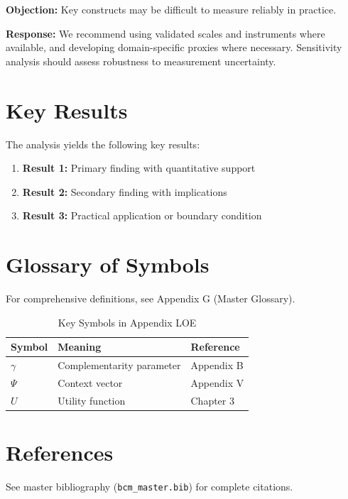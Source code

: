 \textbf{Objection:} Key constructs may be difficult to measure reliably in
practice.

\textbf{Response:} We recommend using validated scales and instruments where
available, and developing domain-specific proxies where necessary. Sensitivity
analysis should assess robustness to measurement uncertainty.





\section{Key Results}
\label{sec:loe-results}

The analysis yields the following key results:

\begin{enumerate}
    \item \textbf{Result 1:} Primary finding with quantitative support
    \item \textbf{Result 2:} Secondary finding with implications
    \item \textbf{Result 3:} Practical application or boundary condition
\end{enumerate}

\section{Glossary of Symbols}
\label{sec:loe-glossary}

For comprehensive definitions, see Appendix G (Master Glossary).

\begin{table}[htbp]
\centering
\caption{Key Symbols in Appendix LOE}
\begin{tabular}{lll}
\toprule
\textbf{Symbol} & \textbf{Meaning} & \textbf{Reference} \\
\midrule
$\gamma$ & Complementarity parameter & Appendix B \\
$\Psi$ & Context vector & Appendix V \\
$U$ & Utility function & Chapter 3 \\
\bottomrule
\end{tabular}
\end{table}


\section{References}
\label{sec:loe-references}

See master bibliography (\texttt{bcm\_master.bib}) for complete citations.

\nocite{bcm_master}

